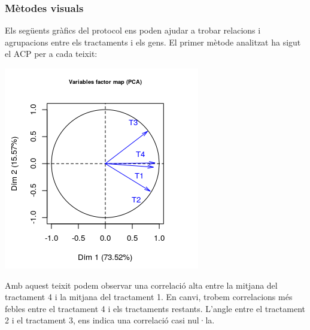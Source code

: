 \documentclass[english]{article}
\begin{document}
\subsubsection{Mètodes visuals}
Els següents gràfics del protocol ens poden ajudar a trobar relacions i agrupacions entre els tractaments i els gens. El primer mètode analitzat ha sigut el ACP per a cada teixit:
\begin{center}
\includegraphics[scale=0.6]{biploti.png}
\end{center}
Amb aquest teixit podem observar una correlació alta entre la mitjana del tractament 4 i la mitjana del tractament 1. En canvi, trobem correlacions més febles entre el tractament 4 i els tractaments restants. L'angle entre el tractament 2 i el tractament 3, ens indica una correlació casi nul·la.
\end{document}
